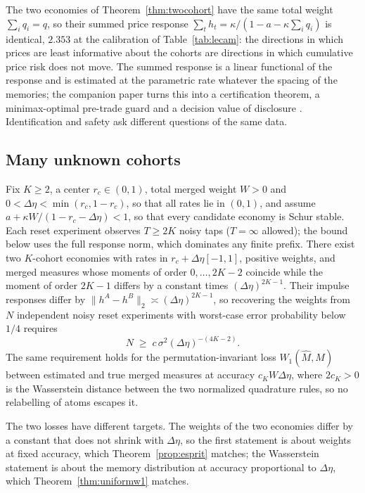 \begin{remark}\label{rem:riskneutral}
The two economies of Theorem~\ref{thm:twocohort} have the same total weight $\sum_iq_i=q$, so their summed price response $\sum_th_t=\kappa/(1-a-\kappa\sum_iq_i)$ is identical, $2.353$ at the calibration of Table~\ref{tab:lecam}: the directions in which prices are least informative about the cohorts are directions in which cumulative price risk does not move. The summed response is a linear functional of the response and is estimated at the parametric rate whatever the spacing of the memories; the companion paper turns this into a certification theorem, a minimax-optimal pre-trade guard and a decision value of disclosure \citep{niroula2026b}. Identification and safety ask different questions of the same data.
\end{remark}

\subsection{Many unknown cohorts}

\begin{theorem}\label{thm:kcohort}
Fix $K\ge2$, a center $r_c\in(0,1)$, total merged weight $W>0$ and $0<\Delta\eta<\min(r_c,1-r_c)$, so that all rates lie in $(0,1)$, and assume $a+\kappa W/(1-r_c-\Delta\eta)<1$, so that every candidate economy is Schur stable. Each reset experiment observes $T\ge2K$ noisy taps ($T=\infty$ allowed); the bound below uses the full response norm, which dominates any finite prefix. There exist two $K$-cohort economies with rates in $r_c+\Delta\eta[-1,1]$, positive weights, and merged measures whose moments of order $0,\ldots,2K-2$ coincide while the moment of order $2K-1$ differs by a constant times $(\Delta\eta)^{2K-1}$. Their impulse responses differ by $\|h^A-h^B\|_2\asymp(\Delta\eta)^{2K-1}$, so recovering the weights from $N$ independent noisy reset experiments with worst-case error probability below $1/4$ requires
\[
N\;\ge\;c\,\sigma^2(\Delta\eta)^{-(4K-2)} .
\]
The same requirement holds for the permutation-invariant loss $W_1(\hat M,M)$ between estimated and true merged measures at accuracy $c_KW\Delta\eta$, where $2c_K>0$ is the Wasserstein distance between the two normalized quadrature rules, so no relabelling of atoms escapes it.
\end{theorem}

The two losses have different targets. The weights of the two economies differ by a constant that does not shrink with $\Delta\eta$, so the first statement is about weights at fixed accuracy, which Theorem~\ref{prop:esprit} matches; the Wasserstein statement is about the memory distribution at accuracy proportional to $\Delta\eta$, which Theorem~\ref{thm:uniformw1} matches.

